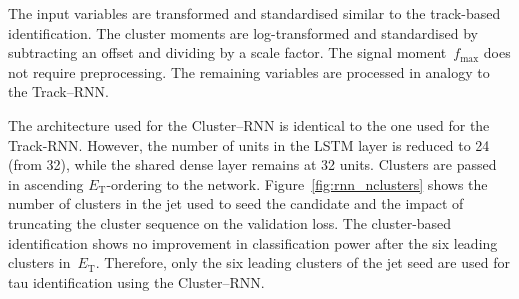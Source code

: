 The input variables are transformed and standardised similar to the track-based
identification. The cluster moments are log-transformed and standardised by
subtracting an offset and dividing by a scale factor. The signal
moment~$f_\text{max}$ does not require preprocessing. The remaining variables
are processed in analogy to the Track--RNN.

The architecture used for the Cluster--RNN is identical to the one used for the
Track-RNN. However, the number of units in the LSTM layer is reduced to 24 (from
32), while the shared dense layer remains at 32 units. Clusters are passed in
ascending $E_\text{T}$-ordering to the network. Figure~\ref{fig:rnn_nclusters}
shows the number of clusters in the jet used to seed the \tauhadvis candidate
and the impact of truncating the cluster sequence on the validation loss. The
cluster-based identification shows no improvement in classification power after
the six leading clusters in~$E_\text{T}$. Therefore, only the six leading
clusters of the jet seed are used for tau identification using the Cluster--RNN.

